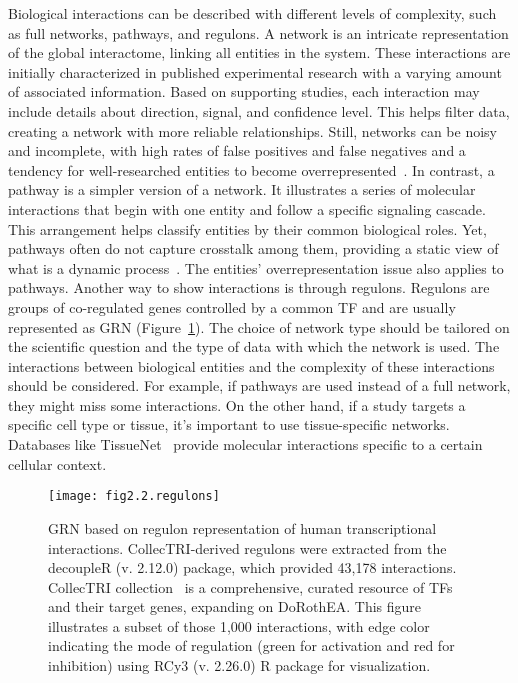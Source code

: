 Biological interactions can be described with different levels of complexity, such as full networks, pathways, and regulons. A network is an intricate representation of the global interactome, linking all entities in the system. These interactions are initially characterized in published experimental research with a varying amount of associated information. Based on supporting studies, each interaction may include details about direction, signal, and confidence level. This helps filter data, creating a network with more reliable relationships. 
Still, networks can be noisy and incomplete, with high rates of false positives and false negatives and a tendency for well-researched entities to become overrepresented~\cite{RN131, RN38, RN136}. In contrast, a pathway is a simpler version of a network. It illustrates a series of molecular interactions that begin with one entity and follow a specific signaling cascade. This arrangement helps classify entities by their common biological roles. 
Yet, pathways often do not capture crosstalk among them, providing a static view of what is a dynamic process~\cite{RN38}. The entities' overrepresentation issue also applies to pathways. Another way to show interactions is through regulons. 
Regulons are groups of co-regulated genes controlled by a common \gls{TF} and are usually represented as \gls{GRN} (Figure~\ref{fig:fig2.2.regulons}). The choice of network type should be tailored on the scientific question and the type of data with which the network is used. The interactions between biological entities and the complexity of these interactions should be considered. For example, if pathways are used instead of a full network, they might miss some interactions. On the other hand, if a study targets a specific cell type or tissue, it's important to use tissue-specific networks. Databases like TissueNet~\cite{RN137} provide molecular interactions specific to a certain cellular context. 

\begin{figure}[htbp]
    \centering
    \texttt{[image: fig2.2.regulons]}
    \caption[Gene regulatory network based on regulon representation of human transcriptional interactions.]{\gls{GRN} based on regulon representation of human transcriptional interactions. CollecTRI-derived regulons were extracted from the decoupleR (v. 2.12.0) package, which provided 43,178 interactions. CollecTRI collection~\cite{RN145} is a comprehensive, curated resource of \gls{TF}s and their target genes, expanding on DoRothEA. This figure illustrates a subset of those 1,000 interactions, with edge color indicating the mode of regulation (green for activation and red for inhibition) using RCy3 (v. 2.26.0) R package for visualization.}
    \label{fig:fig2.2.regulons}
\end{figure}

